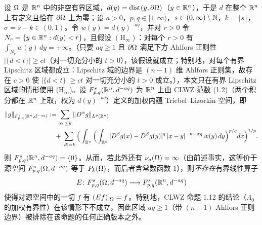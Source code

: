 \begin{theorem}
设 $\Omega$ 是 $\mathbb{R}^n$ 中的非空有界区域，$d(y)=\operatorname{dist}(y,\partial\Omega)$（$y\in\mathbb{R}^n$），于是 $d$ 在整个 $\mathbb{R}^n$ 上有定义且恰在 $\partial\Omega$ 上为零；设 $a>0$，$p,q\in[1,\infty)$，$s\in(0,\infty)\setminus\mathbb{N}$，$k=\lfloor s\rfloor$，$\sigma=s-k\in(0,1)$。令 $w(y)=d(y)^{-aq}$，并对 $r>0$ 令 $N_r=\{y\in\mathbb{R}^n:d(y)<r\}$，且假设 $\mathrm{(H_{\infty})}$：对每个 $r>0$ 有 $\int_{N_r}w(y)\,dy=+\infty$。（只要 $aq\ge1$ 且 $\partial\Omega$ 满足下方 Ahlfors 正则性 $|\{d<t\}|\ge ct$（对一切充分小的 $t>0$），该假设就成立；特别地，对每个有界 Lipschitz 区域都成立：Lipschitz 域的边界是 $(n-1)$ 维 Ahlfors 正则集，故存在 $c>0$ 使 $|\{d<t\}|\ge ct$ 对一切充分小的 $t>0$ 成立。），本文只在有界 Lipschitz 区域的情形使用 (H$_{\infty}$)。设 $F^{s}_{p,q}(\mathbb{R}^n,d^{-aq})$ 为 $\mathbb{R}^n$ 上由 CLWZ 范数 (1.2)（两个积分都在 $\mathbb{R}^n$ 上取，权为 $d(y)^{-aq}$）定义的加权内蕴 Triebel--Lizorkin 空间，即
\begin{equation}\label{eq:sec6-f4-norm}
  \begin{split}
    \|g\|_{F^s_{p,q}(\mathbb{R}^n,d^{-aq})}
    &:=\sum_{|\alpha|\le k}\|D^\alpha g\|_{L^p(\mathbb{R}^n)}\\
    &\quad+\sum_{|\beta|=k}\Big(\int_{\mathbb{R}^n}\Big(\int_{\mathbb{R}^n}|D^\beta g(x)-D^\beta g(y)|^q\,|x-y|^{-n-\sigma q}\,w(y)\,dy\Big)^{p/q}dx\Big)^{1/p}.
  \end{split}
\end{equation}
则 $F^{s}_{p,q}(\mathbb{R}^n,d^{-aq})=\{0\}$。从而，若此外还有 $\nu_{a}(\Omega)=\infty$（由前述事实，这等价于源空间 $F^{s}_{p,q}(\Omega,d^{-aq})$ 等于 $P_k(\Omega)$，而后者含常数函数 $1$），则\emph{不存在}有界线性算子
\[
  E\colon F^{s}_{p,q}(\Omega,d^{-aq})\longrightarrow F^{s}_{p,q}(\mathbb{R}^n,d^{-aq})
\]
使得对源空间中的一切 $f$ 有 $(Ef)|_\Omega=f$。特别地，CLWZ 命题 1.12 的结论（$\Lambda_0$ 的加权有界性）在该情形下不成立，因此区域 $aq\ge1$（带 $(n-1)$-Ahlfors 正则边界）被排除在该命题的任何正确版本之外。
\end{theorem}

